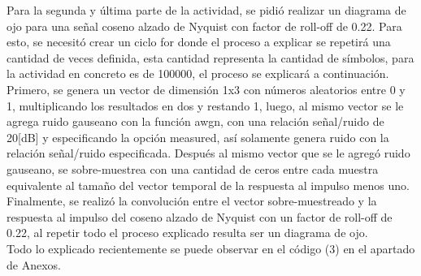 \documentclass[lettersize,journal]{IEEEtran}
\begin{document}
Para la segunda y última parte de la actividad, se pidió realizar un diagrama de ojo para una señal coseno alzado de Nyquist con factor de roll-off de 0.22. Para esto, se necesitó crear un ciclo for donde el proceso a explicar se repetirá una cantidad de veces definida, esta cantidad representa la cantidad de símbolos, para la actividad en concreto es de 100000, el proceso se explicará a continuación. Primero, se genera un vector de dimensión 1x3 con números aleatorios entre 0 y 1, multiplicando los resultados en dos y restando 1, luego, al mismo vector se le agrega ruido gauseano con la función awgn, con una relación señal/ruido de 20[dB] y especificando la opción measured, así solamente genera ruido con la relación señal/ruido especificada. Después al mismo vector que se le agregó ruido gauseano, se sobre-muestrea con una cantidad de ceros entre cada muestra equivalente al tamaño del vector temporal de la respuesta al impulso menos uno.\\
Finalmente, se realizó la convolución entre el vector sobre-muestreado y la respuesta al impulso del coseno alzado de Nyquist con un factor de roll-off de 0.22, al repetir todo el proceso explicado resulta ser un diagrama de ojo.
\\
Todo lo explicado recientemente se puede observar en el código (3) en el apartado de Anexos.




\vspace{2mm}


\vspace{2mm}

\end{document}
